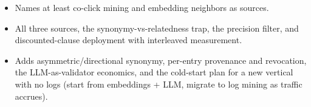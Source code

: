 \begin{interviewq}
\goodgreat
\begin{itemize}
    \item {} Names at least co-click mining and embedding neighbors as sources.
    \item {} All three sources, the synonymy-vs-relatedness trap, the precision filter, and discounted-clause deployment with interleaved measurement.
    \item {} Adds asymmetric/directional synonymy, per-entry provenance and revocation, the LLM-as-validator economics, and the cold-start plan for a new vertical with no logs (start from embeddings + LLM, migrate to log mining as traffic accrues).
\end{itemize}

\end{interviewq}


